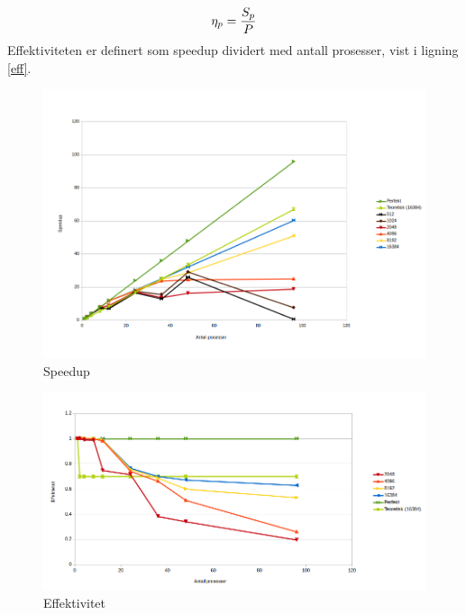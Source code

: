 \documentclass{article}
\begin{document}
\begin{equation}
	\label{eff}
	\eta_{p} = {S_{p} \over P} 
\end{equation}
Effektiviteten er definert som speedup dividert med antall prosesser, vist i ligning \ref{eff}. \\ 

\begin{figure}[t]
	\centering
	\includegraphics[width=12cm]{img/speedup.png}
	\caption{Speedup}
	\label{fig:speedup}
		
\end{figure}

\begin{figure}[t]
	\centering
	\includegraphics[width=12cm]{img/efficiency.png}
	\caption{Effektivitet}		
	\label{fig:eff}
\end{figure}
\end{document}
